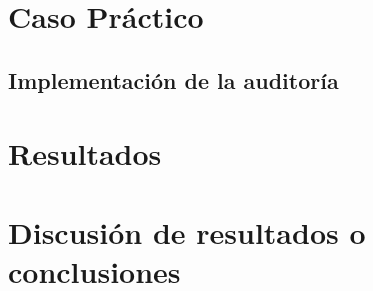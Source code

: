 \documentclass[a4paper, 10pt]{article}
\begin{document}
\section{Caso Práctico}

\subsection{Implementación de la auditoría}


\clearpage

\section{Resultados}



\clearpage

\section{Discusión de resultados o conclusiones}



\clearpage
\end{document}
